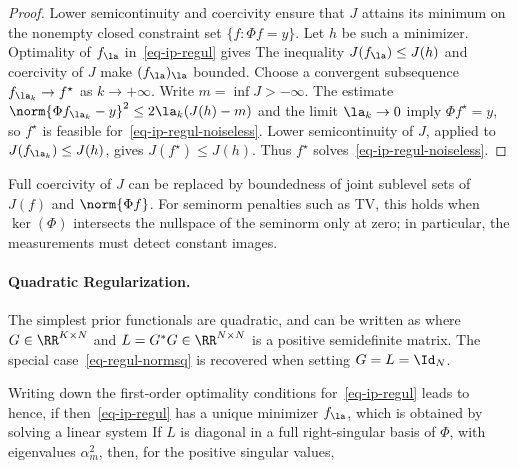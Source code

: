 \begin{proof}
	Lower semicontinuity and coercivity ensure that $J$ attains its minimum on the nonempty closed constraint set $\{f:\Phi f=y\}$. Let $h$ be such a minimizer. Optimality of $f_\la$ in~\eqref{eq-ip-regul} gives
    The inequality $J(f_\la) \leq J(h)$ and coercivity of $J$ make $(f_\la)_\la$ bounded. Choose a convergent subsequence $f_{\la_k} \rightarrow f^\star$ as $k \rightarrow +\infty$. Write $m=\inf J> -\infty$. The estimate $\norm{\Phi f_{\la_k}-y}^2\leq2\la_k(J(h)-m)$ and the limit $\la_k\to0$ imply $\Phi f^\star = y$, so $f^\star$ is feasible for~\eqref{eq-ip-regul-noiseless}. Lower semicontinuity of $J$, applied to $J(f_{\la_k}) \leq J(h)$, gives $J(f^\star) \leq J(h)$. Thus $f^\star$ solves~\eqref{eq-ip-regul-noiseless}.
\end{proof}

Full coercivity of $J$ can be replaced by boundedness of joint sublevel sets of $J(f)$ and $\norm{\Phi f}$. For seminorm penalties such as TV, this holds when $\ker(\Phi)$ intersects the nullspace of the seminorm only at zero; in particular, the measurements must detect constant images.


\paragraph{Quadratic Regularization.}

The simplest prior functionals are quadratic, and can be written as
where $G \in \RR^{K \times N}$ and 
$L=G^*G \in \RR^{N \times N}$ is a positive semidefinite matrix.
%
The special case~\eqref{eq-regul-normsq} is recovered when setting $G=L=\Id_N$. 

Writing down the first-order optimality conditions for~\eqref{eq-ip-regul} leads to
hence, if
then~\eqref{eq-ip-regul} has a unique minimizer $f_\la$, which is obtained by solving a linear system
If $L$ is diagonal in a full right-singular basis of $\Phi$, with eigenvalues $\alpha_m^2$, then, for the positive singular values,



